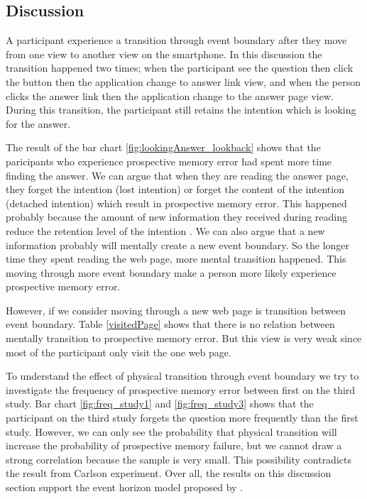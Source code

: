\subsection{Discussion}
A participant experience a transition through event boundary after they move from one view to another view on the smartphone.
In this discussion the transition happened two times; when the participant see the question then click the button then the application change to answer link view,
and when the person clicks the answer link then the application change to the answer page view.
During this transition, the participant still retains the intention which is looking for the answer.

The result of the bar chart \ref{fig:lookingAnswer_lookback}  shows that the paricipants who experience prospective memory error had spent more time finding the answer.
We can argue that when they are reading the answer page, they forget the intention (lost intention) or forget the content of the intention (detached intention) which result in prospective memory error.
This happened probably because the amount of new information they received during reading reduce the retention level of the intention \citep{Reason1984}.
We can also argue that a new information probably will mentally create a new event boundary. So the longer time they spent reading the web page, more mental transition happened.
This moving through more event boundary make a person more likely experience prospective memory error.

However, if we consider moving through a new web page is transition between event boundary. Table \ref{visitedPage} shows that there is no relation between mentally transition to prospective memory error.
But this view is very weak since most of the participant only visit the one web page.

To understand the effect of physical transition through event boundary we try to investigate the frequency of prospective memory error between first on the third study.
Bar chart \ref{fig:freq_study1} and \ref{fig:freq_study3} shows that the participant on the third study forgets the question more frequently than the first study. However,
we can only see the probability that physical transition will increase the probability of prospective memory failure, but
we cannot draw a strong correlation because the sample is very small.
This possibility contradicts the result from Carlson experiment.
Over all, the results on this discussion section support the event horizon model proposed by \cite{Radvansky2006}.
